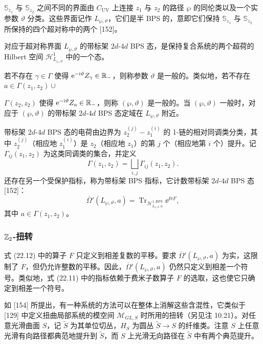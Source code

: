 $\mathbb{S}_{z_1}$ 与 $\mathbb{S}_{z_2}$ 之间不同的界面由 $C_{\mathrm{UV}}$ 上连接 $z_1$ 与 $z_2$ 的路径 $\wp$ 的同伦类以及一个实参数 $\vartheta$ 分类。这些界面记作 $L_{\wp,\vartheta}$，它们是半 BPS 的，意即它们保持 $\mathbb{S}_{z_1}$ 与 $\mathbb{S}_{z_2}$ 所保持的四个超对称中的两个 [152]。

\begin{definition}[22.18]
对应于超对称界面 $L_{\wp,\vartheta}$ 的带标架 $2d$-$4d$ BPS 态，是保持复合系统的两个超荷的 Hilbert 空间 $\mathcal{H}^1_{L_{\wp,\vartheta}}$ 中的一个态。
\end{definition}

\begin{remark}[22.19]
若不存在 $\gamma\in\Gamma$ 使得 $\mathrm{e}^{-\mathrm{i}\vartheta}Z_\gamma\in\mathbb{R}_-$，则称参数 $\vartheta$ 是一般的。类似地，若不存在 $a\in\Gamma(z_1,z_2)\cup$

$\Gamma(z_2,z_2)$ 使得 $\mathrm{e}^{-\mathrm{i}\vartheta}Z_a\in\mathbb{R}_-$，则称 $(\wp,\vartheta)$ 是一般的。当 $(\wp,\vartheta)$ 一般时，对应于 $(\wp,\vartheta)$ 的带标架 $2d$-$4d$ BPS 态定域在 $L_{\wp,\vartheta}$ 附近。
\end{remark}

带标架 $2d$-$4d$ BPS 态的电荷由边界为 $z_2^{(j)}-z_1^{(i)}$ 的 1-链的相对同调类分类，其中 $z_2^{(j)}$（相应地 $z_1^{(i)}$）是 $z_2$（相应地 $z_1$）的第 $j$ 个（相应地第 $i$ 个）提升。记 $\Gamma_{ij}(z_1,z_2)$ 为这类同调类的集合，并定义
\[
\Gamma(z_1,z_2)=\bigsqcup_{i,j}\Gamma_{ij}(z_1,z_2).
\]
还存在另一个受保护指标，称为带标架 BPS 指标，它计数带标架 $2d$-$4d$ BPS 态 [152]：
\begin{equation}
\overline{\Omega}{}'(L_{\wp,\vartheta},a)=\operatorname{Tr}_{\mathcal{H}^{1,\mathrm{BPS}}_{L_{\wp,\vartheta},a}}\ee^{\ii\pi F},\tag{22.12}
\end{equation}
其中 $a\in\Gamma(z_1,z_2)$。

\subsubsection*{$\mathbb{Z}_2$-扭转}

式 (22.12) 中的算子 $F$ 只定义到相差复数的平移。要求 $\overline{\Omega}{}'(L_{\wp,\vartheta},a)$ 为实，这限制了 $F$，但仍允许整数的平移。因此，$\overline{\Omega}{}'(L_{\wp,\vartheta},a)$ 仍然只定义到相差一个符号。类似地，式 (22.11) 中的指标依赖于费米子数算子 $F$ 的选取，这也使它只确定到相差一个符号。

如 [154] 所提出，有一种系统的方法可以在整体上消解这些含混性，它类似于 [129] 中定义扭曲局部系统的模空间 $\mathcal{M}_{GL,S}$ 时所用的扭转（另见注 10.21）。对任意光滑曲面 $S$，记 $\widetilde{S}$ 为其单位切丛，$H_S$ 为圆丛 $\widetilde{S}\to S$ 的纤维类。注意 $S$ 上任意光滑有向路径都典范地提升到 $\widetilde{S}$，而 $S$ 上光滑无向路径在 $\widetilde{S}$ 中有两个典范提升。

